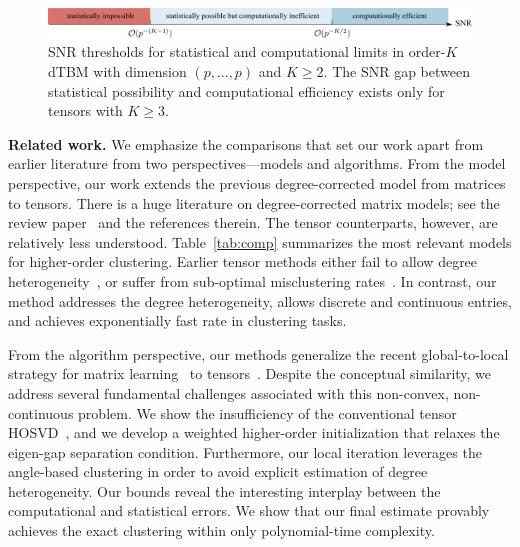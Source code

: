 \documentclass[lettersize,journal]{IEEEtran}
\theoremstyle{definition}
\theoremstyle{definition}
\begin{document}
\begin{figure}[t]
    \centering
    \includegraphics[width = 17cm]{phase.pdf}
    \caption{SNR thresholds for statistical and computational limits in order-$K$ dTBM with dimension $(p,...,p)$ and $K \geq 2$. The SNR gap between statistical possibility and computational efficiency  exists only for tensors with $K \geq 3$. }
    \label{fig:phase_axis}
\end{figure}




{\bf Related work.} %
We emphasize the comparisons that set our work apart from earlier literature from two perspectives---models and algorithms. From the model perspective, our work extends the previous degree-corrected model from matrices to tensors. There is a huge literature on degree-corrected matrix models; see the review paper~\citep{abbe2017community} and the references therein. The tensor counterparts, however, are relatively less understood. Table~\ref{tab:comp} summarizes  the most relevant models for higher-order clustering. Earlier tensor methods either fail to allow degree heterogeneity~\citep{chien2018community,han2020exact,zhang2021exact,ghoshdastidar2017uniform,kim2018stochastic}, or suffer from sub-optimal misclustering rates~\citep{ke2019community,ghoshdastidar2017consistency,chi2020provable}. In contrast, our method addresses the degree heterogeneity, allows discrete and continuous entries, and achieves exponentially fast rate in clustering tasks.  

From the algorithm perspective, our methods generalize the recent global-to-local strategy for matrix learning~\citep{gao2018community,chi2019nonconvex,yun2016optimal} to tensors~\citep{han2020exact,ahn2018hypergraph,kim2018stochastic}. Despite the conceptual similarity, we address several fundamental challenges associated with this non-convex, non-continuous problem. We show the insufficiency of the conventional tensor HOSVD~\citep{kolda2009tensor}, and we develop a weighted higher-order initialization that relaxes the eigen-gap separation condition. Furthermore, our local iteration leverages the angle-based clustering in order to avoid explicit estimation of degree heterogeneity. Our bounds reveal the interesting interplay between the computational and statistical errors. We show that our final estimate provably achieves the exact clustering within only polynomial-time complexity. 
\end{document}
